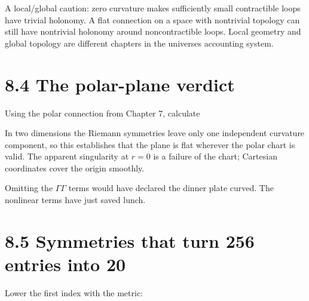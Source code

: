 \documentclass[
  11pt,
  letterpaper,
  oneside,
  openany]{scrbook}
\begin{document}
A local/global caution: zero curvature makes sufficiently small
contractible loops have trivial holonomy. A flat connection on a space
with nontrivial topology can still have nontrivial holonomy around
noncontractible loops. Local geometry and global topology are different
chapters in the universe\textquotesingle s accounting system.

\hypertarget{the-polar-plane-verdict}{%
\section{8.4 The polar-plane verdict}\label{the-polar-plane-verdict}}

Using the polar connection from Chapter 7, calculate

\begin{center}
\begingroup
{}
\ifdim\wd\grmathbox>\linewidth
\resizebox{\linewidth}{!}{\usebox{\grmathbox}}
\else\usebox{\grmathbox}\fi
\endgroup
\end{center}

In two dimensions the Riemann symmetries leave only one independent
curvature component, so this establishes that the plane is flat wherever
the polar chart is valid. The apparent singularity at \(r=0\) is a
failure of the chart; Cartesian coordinates cover the origin smoothly.

Omitting the \(\Gamma\Gamma\) terms would have declared the dinner plate
curved. The nonlinear terms have just saved lunch.

\hypertarget{symmetries-that-turn-256-entries-into-20}{%
\section{8.5 Symmetries that turn 256 entries into
20}\label{symmetries-that-turn-256-entries-into-20}}

Lower the first index with the metric:

\begin{center}
\begingroup
{}
\ifdim\wd\grmathbox>\linewidth
\resizebox{\linewidth}{!}{\usebox{\grmathbox}}
\else\usebox{\grmathbox}\fi
\endgroup
\end{center}
\end{document}
